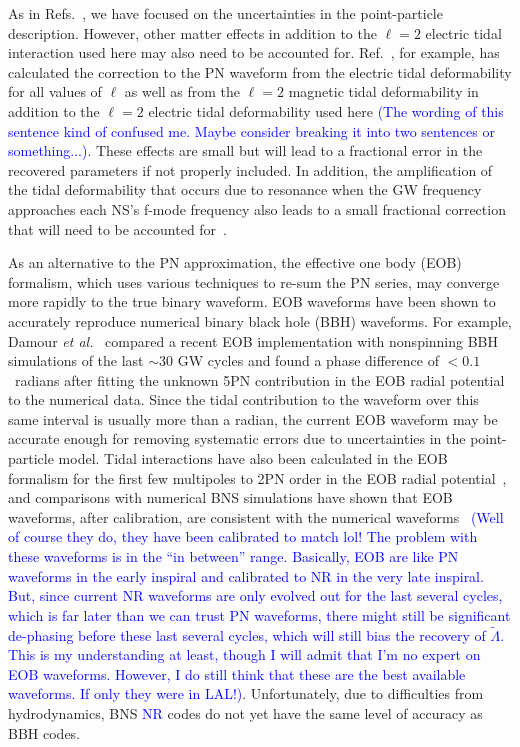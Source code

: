 \documentclass[twocolumn,prd,amssymb,aps,nofootinbib,showpacs,epsf]{revtex4}
\newcommand\les[2]{\textcolor{blue}{{#1}\sout{#2}}}
\begin{document}
As in Refs.~\cite{Favata2014, YagiYunes2014, WadeCreightonOchsner2014}, we have focused on the uncertainties in the point-particle description. However, other matter effects in addition to the $\ell=2$ electric tidal interaction used here may also need to be accounted for. Ref.~\cite{Yagi2014}, for example, has calculated the correction to the PN waveform from the electric tidal deformability for all values of $\ell$ as well as from the $\ell=2$ magnetic tidal deformability in addition to the $\ell=2$ electric tidal deformability used here \les{(The wording of this sentence kind of confused me.  Maybe consider breaking it into two sentences or something...)}{}. These effects are small but will lead to a fractional error in the recovered parameters if not properly included. In addition, the amplification of the tidal deformability that occurs due to resonance when the GW frequency approaches each NS's f-mode frequency also leads to a small fractional correction that will need to be accounted for~\cite{FlanaganHinderer2008}. 

As an alternative to the PN approximation, the effective one body (EOB) formalism, which uses various techniques to re-sum the PN series, may converge more rapidly to the true binary waveform. EOB waveforms have been shown to accurately reproduce numerical binary black hole (BBH) waveforms. For example, Damour {\it et al.}~\cite{DamourNagarBernuzzi2013} compared a recent EOB implementation with nonspinning BBH simulations of the last $\sim 30$ GW cycles and found a phase difference of $<0.1$~radians after fitting the unknown 5PN contribution in the EOB radial potential to the numerical data. Since the tidal contribution to the waveform over this same interval is usually more than a radian, the current EOB waveform may be accurate enough for removing systematic errors due to uncertainties in the point-particle model. Tidal interactions have also been calculated in the EOB formalism for the first few multipoles to 2PN order in the EOB radial potential~\cite{BiniDamourFaye2012}, and comparisons with numerical BNS simulations have shown that EOB waveforms, after calibration, are consistent with the numerical waveforms~\cite{BernuzziNagarThierfelder2012, HotokazakaKyutokuShibata2013} \les{(Well of course they do, they have been calibrated to match lol!  The problem with these waveforms is in the ``in between'' range.  Basically, EOB are like PN waveforms in the early inspiral and calibrated to NR in the very late inspiral.  But, since current NR waveforms are only evolved out for the last several cycles, which is far later than we can trust PN waveforms, there might still be significant de-phasing before these last several cycles, which will still bias the recovery of $\tilde\Lambda$.  This is my understanding at least, though I will admit that I'm no expert on EOB waveforms.  However, I do still think that these are the best available waveforms.  If only they were in LAL!)}{}. Unfortunately, due to difficulties from hydrodynamics, BNS \les{NR}{} codes do not yet have the same level of accuracy as BBH codes.
\end{document}

